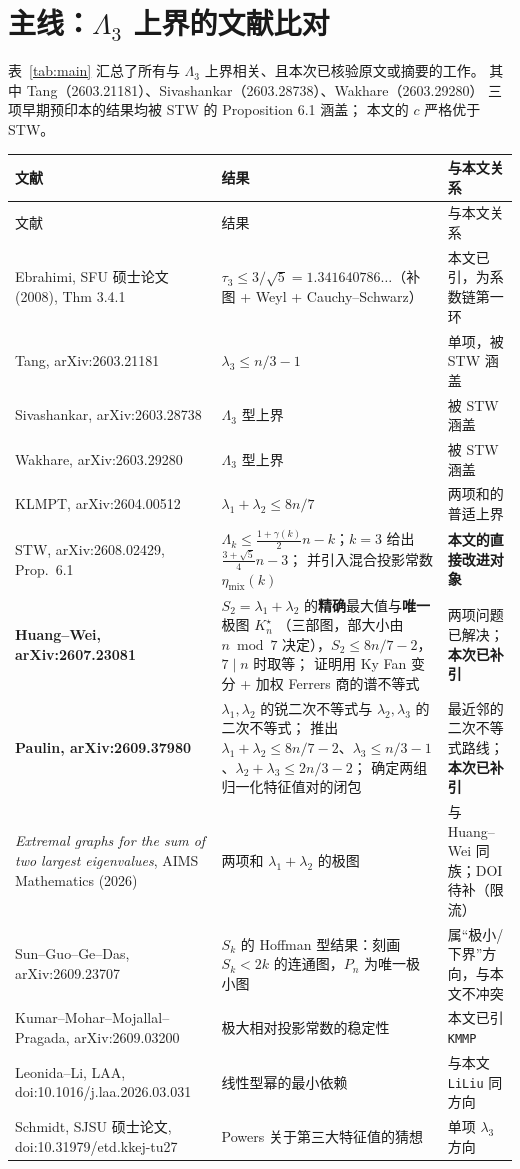 \documentclass[UTF8,11pt]{ctexart}
\newcommand{\Lam}{\Lambda}
\begin{document}
\section{主线：$\Lam_3$ 上界的文献比对}

表~\ref{tab:main} 汇总了所有与 $\Lam_3$ 上界相关、且本次已核验原文或摘要的工作。
其中 Tang（2603.21181）、Sivashankar（2603.28738）、Wakhare（2603.29280）
三项早期预印本的结果均被 STW 的 Proposition 6.1 涵盖；
本文的 $c$ 严格优于 STW。

\begin{table}[htbp]
\centering\small
\caption{与 $\Lam_3$ 上界相关的已核验文献}\label{tab:main}
\begin{longtable}{@{}p{4.6cm}p{6.4cm}p{4.2cm}@{}}
\toprule
文献 & 结果 & 与本文关系\\
\midrule
\endfirsthead
\toprule
文献 & 结果 & 与本文关系\\
\midrule
\endhead
Ebrahimi, SFU 硕士论文 (2008), Thm 3.4.1 &
$\tau_3\le3/\sqrt5=1.341640786\ldots$（补图 + Weyl + Cauchy--Schwarz） &
本文已引，为系数链第一环\\
Tang, arXiv:2603.21181 & $\lambda_3\le n/3-1$ & 单项，被 STW 涵盖\\
Sivashankar, arXiv:2603.28738 & $\Lam_3$ 型上界 & 被 STW 涵盖\\
Wakhare, arXiv:2603.29280 & $\Lam_3$ 型上界 & 被 STW 涵盖\\
KLMPT, arXiv:2604.00512 & $\lambda_1+\lambda_2\le8n/7$ & 两项和的普适上界\\
STW, arXiv:2608.02429, Prop.\ 6.1 &
$\Lam_k\le\frac{1+\gamma(k)}2n-k$；$k=3$ 给出 $\frac{3+\sqrt5}4n-3$；
并引入混合投影常数 $\eta_{\mathrm{mix}}(k)$ &
\textbf{本文的直接改进对象}\\
\textbf{Huang--Wei, arXiv:2607.23081} &
$S_2=\lambda_1+\lambda_2$ 的\textbf{精确}最大值与\textbf{唯一}极图 $K_n^\star$
（三部图，部大小由 $n\bmod7$ 决定），$S_2\le8n/7-2$，$7\mid n$ 时取等；
证明用 Ky Fan 变分 + 加权 Ferrers 商的谱不等式 &
两项问题已解决；\textbf{本次已补引}\\
\textbf{Paulin, arXiv:2609.37980} &
$\lambda_1,\lambda_2$ 的锐二次不等式与 $\lambda_2,\lambda_3$ 的二次不等式；
推出 $\lambda_1+\lambda_2\le8n/7-2$、$\lambda_3\le n/3-1$、$\lambda_2+\lambda_3\le2n/3-2$；
确定两组归一化特征值对的闭包 &
最近邻的二次不等式路线；\textbf{本次已补引}\\
\emph{Extremal graphs for the sum of two largest eigenvalues}, AIMS Mathematics (2026) &
两项和 $\lambda_1+\lambda_2$ 的极图 &
与 Huang--Wei 同族；DOI 待补（限流）\\
Sun--Guo--Ge--Das, arXiv:2609.23707 &
$S_k$ 的 Hoffman 型结果：刻画 $S_k<2k$ 的连通图，$P_n$ 为唯一极小图 &
属``极小/下界''方向，与本文不冲突\\
Kumar--Mohar--Mojallal--Pragada, arXiv:2609.03200 &
极大相对投影常数的稳定性 & 本文已引 \texttt{KMMP}\\
Leonida--Li, LAA, doi:10.1016/j.laa.2026.03.031 &
线性型幂的最小依赖 & 与本文 \texttt{LiLiu} 同方向\\
Schmidt, SJSU 硕士论文, doi:10.31979/etd.kkej-tu27 &
Powers 关于第三大特征值的猜想 & 单项 $\lambda_3$ 方向\\
\bottomrule
\end{longtable}
\end{table}
\end{document}
